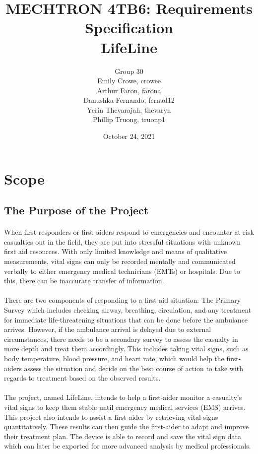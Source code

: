 \documentclass{article}
\title{MECHTRON 4TB6: Requirements Specification \\ LifeLine}
\author{Group 30 \\ Emily Crowe, crowee \\ Arthur Faron, farona \\ Danushka Fernando, fernad12 \\Yerin Thevarajah, thevaryn \\ Phillip Truong, truonp1}
\begin{document}
    \date{October 24, 2021}
	\maketitle
	\newpage
    
	\tableofcontents
	\listoffigures
	\listoftables
	\newpage

	\section{Scope}
	\subsection{The Purpose of the Project}
	\paragraph{}
	When first responders or first-aiders respond to emergencies and encounter at-risk casualties out in the field, they are put into stressful situations with unknown first aid resources. With only limited knowledge and means of qualitative measurements, vital signs can only be recorded mentally and communicated verbally to either emergency medical technicians (EMTs) or hospitals. Due to this, there can be inaccurate transfer of information. 
	\paragraph{}
	There are two components of responding to a first-aid situation: The Primary Survey which includes checking airway, breathing, circulation, and any treatment for immediate life-threatening situations that can be done before the ambulance arrives. However, if the ambulance arrival is delayed due to external circumstances, there needs to be a secondary survey to assess the casualty in more depth and treat them accordingly. This includes taking vital signs, such as body temperature, blood pressure, and heart rate, which would help the first-aiders assess the situation and decide on the best course of action to take with regards to treatment based on the observed results. 
	\paragraph{}
	The project, named LifeLine, intends to help a first-aider monitor a casualty's vital signs to keep them stable until emergency medical services (EMS) arrives. This project also intends to assist a first-aider by retrieving vital signs quantitatively. These results can then guide the first-aider to adapt and improve their treatment plan. The device is able to record and save the vital sign data which can later be exported for more advanced analysis by medical professionals.
	
\end{document}
